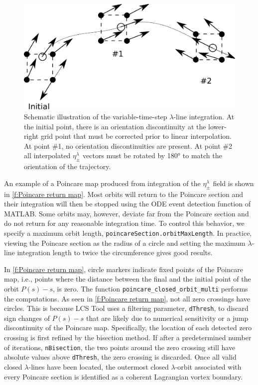 \documentclass{elsarticle}
\begin{document}
\begin{figure}
\begin{center}
\includegraphics[width=.8\textwidth]{graphics/variable_step_integration}
\end{center}
\caption{Schematic illustration of the variable-time-step $\lambda$-line integration. At the initial point, there is an orientation discontinuity at the lower-right grid point that must be corrected prior to linear interpolation. At point \#1, no orientation discontinuities are present. At point \#2 all interpolated $\eta_\pm^\lambda$ vectors must be rotated by 180° to match the orientation of the trajectory.}
\label{f:variable step integration}
\end{figure}

An example of a Poincare map produced from integration of the $\eta_\pm^\lambda$ field is shown in \cref{f:Poincare return map}. Most orbits will return to the Poincare section and their integration will then be stopped using the ODE event detection function of MATLAB. Some orbits may, however, deviate far from the Poincare section and do not return for any reasonable integration time. To control this behavior, we specify a maximum orbit length, \lstinline!poincareSection.orbitMaxLength!. In practice, viewing the Poincare section as the radius of a circle and setting the maximum $\lambda$-line integration length to twice the circumference gives good results.

In \cref{f:Poincare return map}, circle markers indicate fixed points of the Poincare map, i.e., points where the distance between the final and the initial point of the orbit $P(s) - s$, is zero. The function \lstinline!poincare_closed_orbit_multi! performs the computations. As seen in \cref{f:Poincare return map}, not all zero crossings have circles. This is because LCS Tool uses a filtering parameter, \lstinline!dThresh!, to discard sign changes of $P(s) - s$ that are likely due to numerical sensitivity or a jump discontinuity of the Poincare map. Specifically, the location of each detected zero crossing is first refined by the bisection method. If after a predetermined number of iterations, \lstinline!nBisection!, the two points around the zero crossing still have absolute values above \lstinline!dThresh!, the zero crossing is discarded.  Once all valid closed $\lambda$-lines have been located, the outermost closed $\lambda$-orbit associated with every Poincare section is identified as a coherent Lagrangian vortex boundary.
\end{document}
